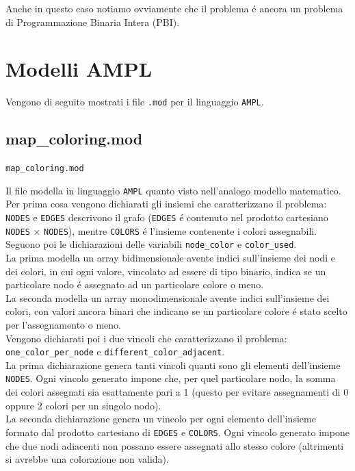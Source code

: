 \documentclass{article}
\begin{document}
Anche in questo caso notiamo ovviamente che il problema \'e ancora un problema di Programmazione Binaria Intera (PBI).\\

\pagebreak

\section{Modelli AMPL}
Vengono di seguito mostrati i file \texttt{.mod} per il linguaggio \texttt{AMPL}.\\

\subsection{map\_coloring.mod}
\texttt{map\_coloring.mod}


\vspace{5mm}

Il file modella in linguaggio \texttt{AMPL} quanto visto nell'analogo modello matematico.\\
Per prima cosa vengono dichiarati gli insiemi che caratterizzano il problema: \texttt{NODES} e \texttt{EDGES} descrivono il grafo (\texttt{EDGES} \'e contenuto nel prodotto cartesiano \texttt{NODES} $\times$ \texttt{NODES}), mentre \texttt{COLORS} \'e l'insieme contenente i colori assegnabili.\\

Seguono poi le dichiarazioni delle variabili \texttt{node\_color} e \texttt{color\_used}.\\
La prima modella un array bidimensionale avente indici sull'insieme dei nodi e dei colori, in cui ogni valore, vincolato ad essere di tipo binario, indica se un particolare nodo \'e assegnato ad un particolare colore o meno.\\

La seconda modella un array monodimensionale avente indici sull'insieme dei colori, con valori ancora binari che indicano se un particolare colore \'e stato scelto per l'assegnamento o meno.\\ 

Vengono dichiarati poi i due vincoli che caratterizzano il problema: \texttt{one\_color\_per\_node} e \texttt{different\_color\_adjacent}.\\
La prima dichiarazione genera tanti vincoli quanti sono gli elementi dell'insieme \texttt{NODES}. Ogni vincolo generato impone che, per quel particolare nodo, la somma dei colori assegnati sia esattamente pari a 1 (questo per evitare assegnamenti di 0 oppure 2 colori per un singolo nodo).\\
La seconda dichiarazione genera un vincolo per ogni elemento dell'insieme formato dal prodotto cartesiano di \texttt{EDGES} e \texttt{COLORS}. Ogni vincolo generato impone che due nodi adiacenti non possano essere assegnati allo stesso colore (altrimenti si avrebbe una colorazione non valida).\\
\end{document}
